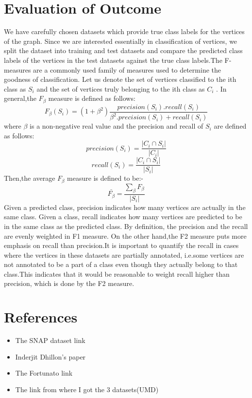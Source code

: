 \documentclass{article}
\begin{document}
\section*{Evaluation of Outcome}
We have carefully chosen datasets which provide true class labels for the vertices of the graph. Since we are interested essentially in classification of vertices, we split the dataset into training and test datasets and compare the predicted class labels of the vertices in the test datasets against the true class labels.The F-measures are a commonly used family of measures used to determine the goodness of classification. Let us denote the set of vertices classified to the ith class as $S_i$ and the set of vertices truly belonging to the ith class as $C_i$ . In general,the $F_{\beta}$ measure is defined as follows:
\begin{equation}
F_{\beta}(S_{i}) = (1+{\beta^2}) \frac{precision(S_{i}).recall(S_{i})}{{\beta^2}.precision(S_{i})+recall(S_{i})}
\end{equation}
where $\beta$ is a non-negative real value and the precision and recall of $S_i$ are defined as follows:
\begin{equation}
precision({S_{i}}) = \frac{ \left|{{C_{i}} \cap {S_{i}}}\right| }{ \left|{C_{i}}\right| } 
\end{equation} 
\begin{equation}
recall({S_{i}}) = \frac{ \left|{{C_{i}} \cap {S_{i}}}\right| }{ \left| {S_{i}} \right| } 
\end{equation} 
Then,the average $F_{\beta}$ measure is defined to be:-
\begin{equation}
\bar{F_{\beta}} = \frac{\sum_{\beta}{F_{\beta}}}{ \left|{S_{i}}\right| }
\end{equation}
Given a predicted class, precision indicates how many vertices are actually in the same class. Given a class, recall indicates how many vertices are predicted to be in the same class as the predicted class. By definition, the precision and the recall are evenly weighted in F1 measure. On the other hand,the F2 measure puts more emphasis on recall than precision.It is important to quantify the recall in cases where the vertices in these datasets are partially annotated, i.e.some vertices are not annotated to be a part of a class even though they actually belong to that class.This indicates that it would be reasonable to weight recall higher than precision, which is done by the F2 measure.

\section*{References}
\begin{itemize}
\item The SNAP dataset link
\item Inderjit Dhillon's paper
\item The Fortunato link 
\item The link from where I got the 3 datasets(UMD)

\end{itemize}
\end{document}
